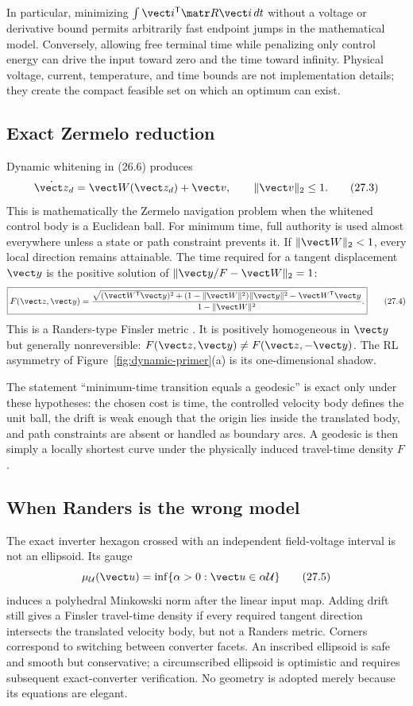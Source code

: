 In particular, minimizing \(\int\vect i^{\mathsf T}\matr R\vect i\,dt\)
without a voltage or derivative bound permits arbitrarily fast endpoint jumps
in the mathematical model.  Conversely, allowing free terminal time while
penalizing only control energy can drive the input toward zero and the time
toward infinity.  Physical voltage, current, temperature, and time bounds are
not implementation details; they create the compact feasible set on which an
optimum can exist.

\subsection{Exact Zermelo reduction}

Dynamic whitening in (26.6) produces
\[
 \dot{\vect z}_d=\vect W(\vect z_d)+\vect v,
 \qquad \|\vect v\|_2\leq1.
 \tag{27.3}
\]
This is mathematically the Zermelo navigation problem when the whitened
control body is a Euclidean ball.  For minimum time, full authority is used
almost everywhere unless a state or path constraint prevents it.  If
\(\|\vect W\|_2<1\), every local direction remains attainable.  The time
required for a tangent displacement \(\vect y\) is the positive solution of
\(\|\vect y/F-\vect W\|_2=1\):
\[
 \boxed{
 F(\vect z,\vect y)=
 \frac{\sqrt{(\vect W^{\mathsf T}\vect y)^2
 +(1-\|\vect W\|^2)\|\vect y\|^2}
 -\vect W^{\mathsf T}\vect y}
 {1-\|\vect W\|^2}.}
 \tag{27.4}
\]
This is a Randers-type Finsler metric \parencite{bao2004}.  It is positively
homogeneous in \(\vect y\) but generally nonreversible:
\(F(\vect z,\vect y)\neq F(\vect z,-\vect y)\).  The RL asymmetry of
Figure~\ref{fig:dynamic-primer}(a) is its one-dimensional shadow.



The statement ``minimum-time transition equals a geodesic'' is exact only
under these hypotheses: the chosen cost is time, the controlled velocity body
defines the unit ball, the drift is weak enough that the origin lies inside
the translated body, and path constraints are absent or handled as boundary
arcs.  A geodesic is then simply a locally shortest curve under the physically
induced travel-time density \(F\).

\subsection{When Randers is the wrong model}

The exact inverter hexagon crossed with an independent field-voltage interval
is not an ellipsoid.  Its gauge
\[
 \mu_{\mathcal U}(\vect u)=\inf\{\alpha>0:\vect u\in\alpha\mathcal U\}
 \tag{27.5}
\]
induces a polyhedral Minkowski norm after the linear input map.  Adding drift
still gives a Finsler travel-time density if every required tangent direction
intersects the translated velocity body, but not a Randers metric.  Corners
correspond to switching between converter facets.  An inscribed ellipsoid is
safe and smooth but conservative; a circumscribed ellipsoid is optimistic and
requires subsequent exact-converter verification.  No geometry is adopted
merely because its equations are elegant.

